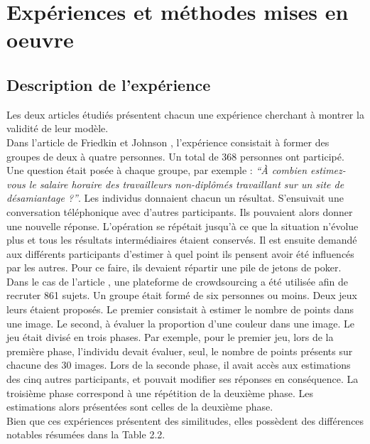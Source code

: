 \documentclass{scrreprt}
\begin{document}
\section{Expériences et méthodes mises en oeuvre}


\subsection{Description de l'expérience}

Les deux articles étudiés présentent chacun une expérience cherchant à montrer la validité de leur modèle.\\

Dans l’article de Friedkin et Johnson \cite{FJ}, l’expérience consistait à former des groupes de deux à quatre personnes. Un total de 368 personnes ont participé. Une question était posée à chaque groupe, par exemple : \textit{ ``À combien estimez-vous le salaire horaire des travailleurs non-diplômés  travaillant sur un site de désamiantage ?''}. Les individus donnaient chacun un résultat. S’ensuivait une conversation téléphonique avec d’autres participants. Ils pouvaient alors donner une nouvelle réponse. L’opération se répétait jusqu’à ce que la situation n’évolue plus et tous les résultats intermédiaires étaient conservés. Il est ensuite demandé aux différents participants d’estimer à quel point ils pensent avoir été influencés par les autres. Pour ce faire, ils devaient répartir une pile de jetons de poker.\\

Dans le cas de l’article \cite{VMG}, une plateforme de crowdsourcing a été utilisée afin de recruter 861 sujets. Un groupe était formé de six personnes ou moins. Deux jeux leurs étaient proposés. Le premier consistait à estimer le nombre de points dans une image. Le second, à évaluer la proportion d'une couleur dans une image. Le jeu était divisé en trois phases. Par exemple, pour le premier jeu, lors de la première phase, l'individu devait évaluer, seul, le nombre de points présents sur chacune des 30 images. Lors de la seconde phase, il avait accès aux estimations des cinq autres participants, et pouvait modifier ses réponses en conséquence. La troisième phase correspond à une répétition de la deuxième phase. Les estimations alors présentées sont celles de la deuxième phase. \\

Bien que ces expériences présentent des similitudes, elles possèdent des différences notables résumées dans la Table 2.2.\\
\end{document}
